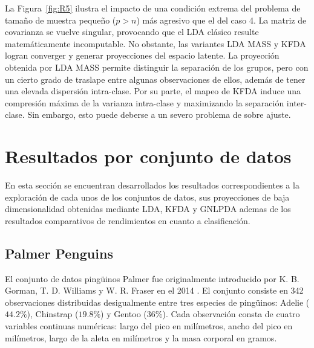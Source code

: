La Figura~\ref{fig:R5} ilustra el impacto de una condición extrema del problema de tamaño de muestra pequeño ($p>n$) más agresivo que el del caso 4. La matriz de covarianza se vuelve singular, provocando que el LDA clásico resulte matemáticamente incomputable. No obstante, las variantes LDA MASS y KFDA logran converger y generar proyecciones del espacio latente. La proyección obtenida por LDA MASS permite distinguir la separación de los grupos, pero con un cierto grado de traslape entre algunas observaciones de ellos, además de tener una elevada dispersión intra-clase. Por su parte, el mapeo de KFDA induce una compresión máxima de la varianza intra-clase y maximizando la separación inter-clase. Sin
embargo, esto puede deberse a un severo problema de sobre ajuste.


\newpage

\section{Resultados por conjunto de datos}

En esta sección se encuentran desarrollados los resultados correspondientes a la exploración de cada unos de los conjuntos de datos, sus proyecciones de baja dimensionalidad obtenidas mediante LDA, KFDA y GNLPDA ademas de los resultados comparativos de rendimientos en cuanto a clasificación. 

\subsection{Palmer Penguins}

El conjunto de datos pingüinos Palmer fue originalmente introducido por K. B. Gorman, T. D. Williams y W. R. Fraser en el 2014 \cite{gorman2014ecological}. El conjunto consiste en 342 observaciones distribuidas desigualmente entre tres especies de pingüinos: Adelie ($44.2\%$), Chinstrap ($19.8\%$) y Gentoo ($36\%$). Cada observación consta de cuatro variables continuas numéricas:   largo del pico en milímetros, ancho del pico en milímetros, largo de la aleta en milímetros y la masa corporal en gramos.

